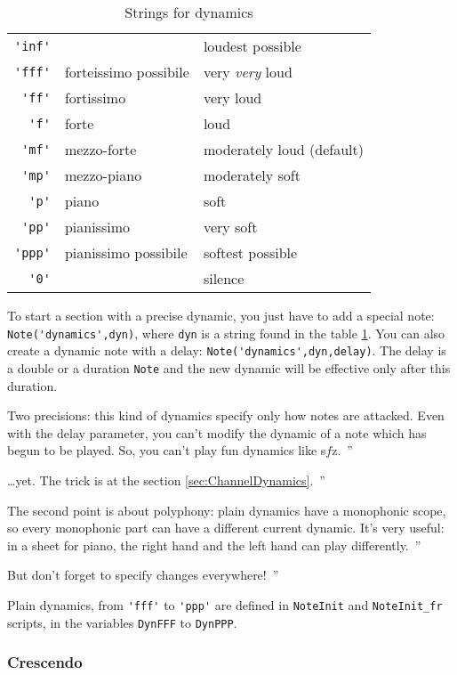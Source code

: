 \documentclass{article}
\newcommand{\note}{\lstinline!Note!\xspace}
\newcommand\sfz{s$\!f\!$z\xspace}
\newenvironment{meenv}{ \par \noindent \makebox[6em][r]{ \textcolor{mecolor}{Me}: `` --~}}{~''}
\newenvironment{myselfenv}{ \par \noindent \makebox[6em][r]{ \textcolor{myselfcolor}{Myself}: `` --~}}{~''}
\newcommand{\me}[1]{\begin{meenv}#1\end{meenv}}
\newcommand{\myself}[1]{\begin{myselfenv}#1\end{myselfenv}}
\begin{document}
\begin{table}
  \centering
  \begin{tabular}{rll}
    \lstinline!'inf'! & & loudest possible \\
    \lstinline!'fff'! & forteissimo possibile & very \emph{very} loud \\
    \lstinline!'ff'! & fortissimo & very loud \\
    \lstinline!'f'! & forte & loud \\
    \lstinline!'mf'! & mezzo-forte & moderately loud (default) \\
    \lstinline!'mp'! & mezzo-piano & moderately soft \\
    \lstinline!'p'! & piano & soft \\
    \lstinline!'pp'! & pianissimo & very soft \\
    \lstinline!'ppp'! & pianissimo possibile & softest possible \\
    \lstinline!'0'! & & silence \\
  \end{tabular}
  \caption{Strings for dynamics}
  \label{tab:dynamics}
\end{table}

To start a section with a precise dynamic, you just have to add a special note: \lstinline!Note('dynamics',dyn)!, where \lstinline!dyn! is a string found in the table \ref{tab:dynamics}. You can also create a dynamic note with a delay: \lstinline!Note('dynamics',dyn,delay)!. The delay is a double or a duration \note and the new dynamic will be effective only after this duration.

\myself{Two precisions: this kind of dynamics specify only how notes are attacked. Even with the delay parameter, you can't modify the dynamic of a note which has begun to be played. So, you can't play fun dynamics like \sfz.}
\me{\dots yet. The trick is at the section \ref{sec:ChannelDynamics}.}
\myself{The second point is about polyphony: plain dynamics have a monophonic scope, so every monophonic part can have a different current dynamic. It's very useful: in a sheet for piano, the right hand and the left hand can play differently.}
\me{But don't forget to specify changes everywhere!}

Plain dynamics, from \lstinline!'fff'! to \lstinline!'ppp'! are defined in \lstinline!NoteInit! and \lstinline!NoteInit_fr! scripts, in the variables \lstinline!DynFFF! to \lstinline!DynPPP!.

\subsubsection{Crescendo}
\label{sec:Crescendo}
\end{document}
